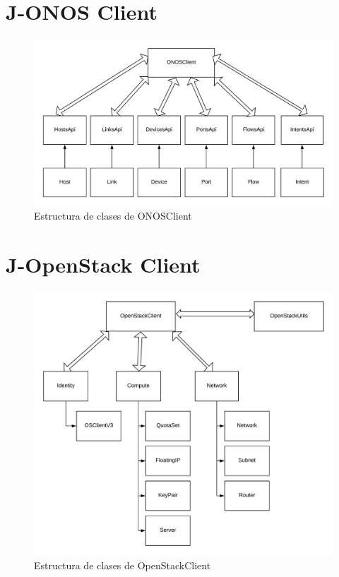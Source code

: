 \section{J-ONOS Client}
\label{sec:onosclient}

\begin{figure}[!ht]
	\centering
	\includegraphics[width=0.9\linewidth]{imagenes/ONOSClient}
	\caption{Estructura de clases de ONOSClient}
	\label{fig:onosclient}
\end{figure}


\section{J-OpenStack Client}
\label{sec:openstackclient}

\begin{figure}[!ht]
	\centering
	\includegraphics[width=0.9\linewidth]{imagenes/OpenStackClient}
	\caption{Estructura de clases de OpenStackClient}
	\label{fig:openstackclient}
\end{figure}

